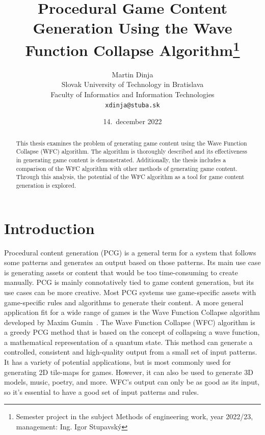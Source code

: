 \documentclass[10pt,oneside,a4paper]{article}
\title{Procedural Game Content Generation Using the Wave Function Collapse Algorithm\thanks{Semester project in the subject Methods of engineering work, year 2022/23, management: Ing. Igor Stupavský }}
\author{Martin Dinja\\[2pt]
	{\small Slovak University of Technology in Bratislava}\\
	{\small Faculty of Informatics and Information Technologies}\\
	{\small \texttt{xdinja@stuba.sk}}
}
\date{\small 14.\ december 2022}
\begin{document}
\maketitle


\begin{abstract}
    \begin{center}
        This thesis examines the problem of generating game content using the Wave Function Collapse (WFC) algorithm.
        The algorithm is thoroughly described and its effectiveness in generating game content is demonstrated.
        Additionally, the thesis includes a comparison of the WFC algorithm with other methods of generating game content.
        Through this analysis, the potential of the WFC algorithm as a tool for game content generation is explored.
    \end{center}
\end{abstract}

\section{Introduction}\label{sec:introduction}

Procedural content generation (PCG) is a general term for a system that follows some patterns and generates an output based on those patterns.
Its main use case is generating assets or content that would be too time-consuming to create manually.
PCG is mainly connotatively tied to game content generation, but its use cases can be more creative.
Most PCG systems use game-specific assets with game-specific rules and algorithms to generate their content.
A more general application fit for a wide range of games is the Wave Function Collapse algorithm developed by Maxim Gumin~\cite{WFC}.
The Wave Function Collapse (WFC) algorithm is a greedy PCG method that is based on the concept of collapsing a wave function, a mathematical representation of a quantum state.
This method can generate a controlled, consistent and high-quality output from a small set of input patterns.
It has a variety of potential applications, but is most commonly used for generating 2D tile-maps for games.
However, it can also be used to generate 3D models, music, poetry, and more.
WFC's output can only be as good as its input, so it's essential to have a good set of input patterns and rules. 
\newpage
\end{document}
